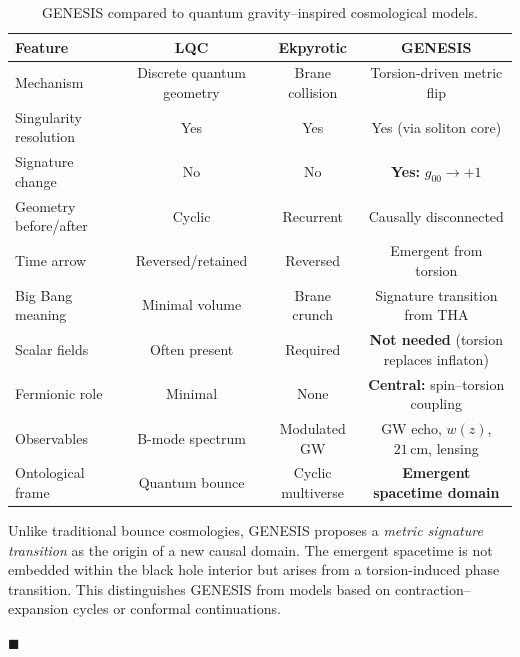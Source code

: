 \documentclass{article}
\begin{document}
\begin{table}[h!]
\centering
\renewcommand{\arraystretch}{1.3}
\begin{tabular}{p{4.2cm} | c | c | c}
\toprule
\textbf{Feature} & \textbf{LQC} & \textbf{Ekpyrotic} & \textbf{GENESIS} \\
\midrule
Mechanism & Discrete quantum geometry & Brane collision & Torsion-driven metric flip \\
Singularity resolution & Yes & Yes & Yes (via soliton core) \\
Signature change & No & No & \textbf{Yes: } $g_{00} \rightarrow +1$ \\
Geometry before/after & Cyclic & Recurrent & Causally disconnected \\
Time arrow & Reversed/retained & Reversed & Emergent from torsion \\
Big Bang meaning & Minimal volume & Brane crunch & Signature transition from THA \\
Scalar fields & Often present & Required & \textbf{Not needed} (torsion replaces inflaton) \\
Fermionic role & Minimal & None & \textbf{Central: } spin–torsion coupling \\
Observables & B-mode spectrum & Modulated GW & GW echo, $w(z)$, $21\,\text{cm}$, lensing \\
Ontological frame & Quantum bounce & Cyclic multiverse & \textbf{Emergent spacetime domain} \\
\bottomrule
\end{tabular}
\caption{GENESIS compared to quantum gravity–inspired cosmological models.}
\label{tab:bounce-modern}
\end{table}


\medskip

\noindent
Unlike traditional bounce cosmologies, GENESIS proposes a \emph{metric signature transition} as the origin of a new causal domain. The emergent spacetime is not embedded within the black hole interior but arises from a torsion-induced phase transition. This distinguishes GENESIS from models based on contraction–expansion cycles or conformal continuations.

\hfill $\blacksquare$

\clearpage
\end{document}
